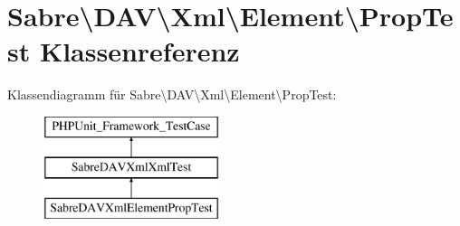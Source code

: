 \hypertarget{class_sabre_1_1_d_a_v_1_1_xml_1_1_element_1_1_prop_test}{}\section{Sabre\textbackslash{}D\+AV\textbackslash{}Xml\textbackslash{}Element\textbackslash{}Prop\+Test Klassenreferenz}
\label{class_sabre_1_1_d_a_v_1_1_xml_1_1_element_1_1_prop_test}
Klassendiagramm für Sabre\textbackslash{}D\+AV\textbackslash{}Xml\textbackslash{}Element\textbackslash{}Prop\+Test\+:\begin{figure}[H]
\begin{center}
\leavevmode
\includegraphics[height=3.000000cm]{class_sabre_1_1_d_a_v_1_1_xml_1_1_element_1_1_prop_test}
\end{center}
\end{figure}
